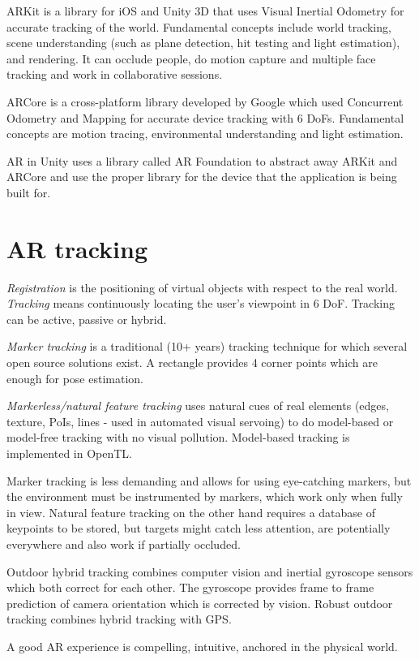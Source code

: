 \documentclass[a4paper]{article}
\begin{document}
ARKit is a library for iOS and Unity 3D that uses Visual Inertial Odometry for accurate tracking of the world. Fundamental concepts include world tracking, scene understanding (such as plane detection, hit testing and light estimation), and rendering. It can occlude people, do motion capture and multiple face tracking and work in collaborative sessions.

ARCore is a cross-platform library developed by Google which used Concurrent Odometry and Mapping for accurate device tracking with 6 DoFs. Fundamental concepts are motion tracing, environmental understanding and light estimation.

AR in Unity uses a library called AR Foundation to abstract away ARKit and ARCore and use the proper library for the device that the application is being built for.


\section{AR tracking}
\emph{Registration} is the positioning of virtual objects with respect to the real world.
\emph{Tracking} means continuously locating the user's viewpoint in 6 DoF.
Tracking can be active, passive or hybrid.

\emph{Marker tracking} is a traditional (10+ years) tracking technique for which several open source solutions exist. A rectangle provides 4 corner points which are enough for pose estimation.

\emph{Markerless/natural feature tracking} uses natural cues of real elements (edges, texture, PoIs, lines - used in automated visual servoing) to do model-based or model-free tracking with no visual pollution. Model-based tracking is implemented in OpenTL.

Marker tracking is less demanding and allows for using eye-catching markers, but the environment must be instrumented by markers, which work only when fully in view. Natural feature tracking on the other hand requires a database of keypoints to be stored, but targets might catch less attention, are potentially everywhere and also work if partially occluded.

Outdoor hybrid tracking combines computer vision and inertial gyroscope sensors which both correct for each other. The gyroscope provides frame to frame prediction of camera orientation which is corrected by vision.
Robust outdoor tracking combines hybrid tracking with GPS.

A good AR experience is compelling, intuitive, anchored in the physical world.
\end{document}
